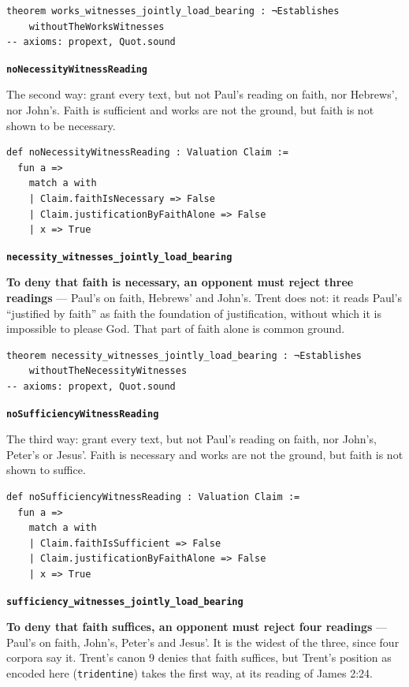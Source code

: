 \documentclass[11pt,paper=\testimonypaper,DIV=13,parskip=false]{scrartcl}
\begin{document}
{\small\begin{verbatim}
theorem works_witnesses_jointly_load_bearing : ¬Establishes
    withoutTheWorksWitnesses
-- axioms: propext, Quot.sound
\end{verbatim}}
\par\medskip\noindent\textbf{\texttt{no\allowbreak{}Necessity\allowbreak{}Witness\allowbreak{}Reading}}\par\nobreak\noindent
The second way: grant every text, but not Paul’s reading on faith, nor Hebrews’, nor John’s. Faith is sufficient and works are not the ground, but faith is not shown to be necessary.

{\small\begin{verbatim}
def noNecessityWitnessReading : Valuation Claim :=
  fun a =>
    match a with
    | Claim.faithIsNecessary => False
    | Claim.justificationByFaithAlone => False
    | x => True
\end{verbatim}}
\par\medskip\noindent\textbf{\texttt{necessity\_\allowbreak{}witnesses\_\allowbreak{}jointly\_\allowbreak{}load\_\allowbreak{}bearing}}\par\nobreak\noindent
\textbf{To deny that faith is necessary, an opponent must reject three readings} — Paul’s on faith, Hebrews’ and John’s. Trent does not: it reads Paul’s “justified by faith” as faith the foundation of justification, without which it is impossible to please God. That part of faith alone is common ground.

{\small\begin{verbatim}
theorem necessity_witnesses_jointly_load_bearing : ¬Establishes
    withoutTheNecessityWitnesses
-- axioms: propext, Quot.sound
\end{verbatim}}
\par\medskip\noindent\textbf{\texttt{no\allowbreak{}Sufficiency\allowbreak{}Witness\allowbreak{}Reading}}\par\nobreak\noindent
The third way: grant every text, but not Paul’s reading on faith, nor John’s, Peter’s or Jesus’. Faith is necessary and works are not the ground, but faith is not shown to suffice.

{\small\begin{verbatim}
def noSufficiencyWitnessReading : Valuation Claim :=
  fun a =>
    match a with
    | Claim.faithIsSufficient => False
    | Claim.justificationByFaithAlone => False
    | x => True
\end{verbatim}}
\par\medskip\noindent\textbf{\texttt{sufficiency\_\allowbreak{}witnesses\_\allowbreak{}jointly\_\allowbreak{}load\_\allowbreak{}bearing}}\par\nobreak\noindent
\textbf{To deny that faith suffices, an opponent must reject four readings} — Paul’s on faith, John’s, Peter’s and Jesus’. It is the widest of the three, since four corpora say it. Trent’s canon 9 denies that faith suffices, but Trent’s position as encoded here (\texttt{tridentine}) takes the first way, at its reading of James 2:24.
\end{document}
